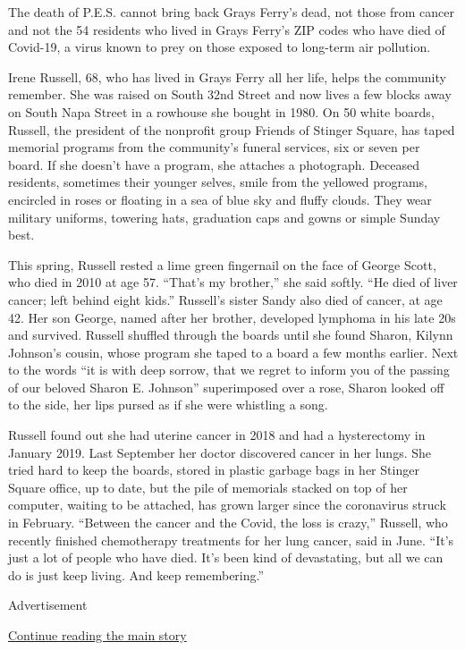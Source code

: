 The death of P.E.S. cannot bring back Grays Ferry's dead, not those from
cancer and not the 54 residents who lived in Grays Ferry's ZIP codes who
have died of Covid-19, a virus known to prey on those exposed to
long-term air pollution.

Irene Russell, 68, who has lived in Grays Ferry all her life, helps the
community remember. She was raised on South 32nd Street and now lives a
few blocks away on South Napa Street in a rowhouse she bought in 1980.
On 50 white boards, Russell, the president of the nonprofit group
Friends of Stinger Square, has taped memorial programs from the
community's funeral services, six or seven per board. If she doesn't
have a program, she attaches a photograph. Deceased residents, sometimes
their younger selves, smile from the yellowed programs, encircled in
roses or floating in a sea of blue sky and fluffy clouds. They wear
military uniforms, towering hats, graduation caps and gowns or simple
Sunday best.

This spring, Russell rested a lime green fingernail on the face of
George Scott, who died in 2010 at age 57. ``That's my brother,'' she
said softly. ``He died of liver cancer; left behind eight kids.''
Russell's sister Sandy also died of cancer, at age 42. Her son George,
named after her brother, developed lymphoma in his late 20s and
survived. Russell shuffled through the boards until she found Sharon,
Kilynn Johnson's cousin, whose program she taped to a board a few months
earlier. Next to the words ``it is with deep sorrow, that we regret to
inform you of the passing of our beloved Sharon E. Johnson''
superimposed over a rose, Sharon looked off to the side, her lips pursed
as if she were whistling a song.

Russell found out she had uterine cancer in 2018 and had a hysterectomy
in January 2019. Last September her doctor discovered cancer in her
lungs. She tried hard to keep the boards, stored in plastic garbage bags
in her Stinger Square office, up to date, but the pile of memorials
stacked on top of her computer, waiting to be attached, has grown larger
since the coronavirus struck in February. ``Between the cancer and the
Covid, the loss is crazy,'' Russell, who recently finished chemotherapy
treatments for her lung cancer, said in June. ``It's just a lot of
people who have died. It's been kind of devastating, but all we can do
is just keep living. And keep remembering.''

Advertisement

\protect\hyperlink{after-bottom}{Continue reading the main story}

